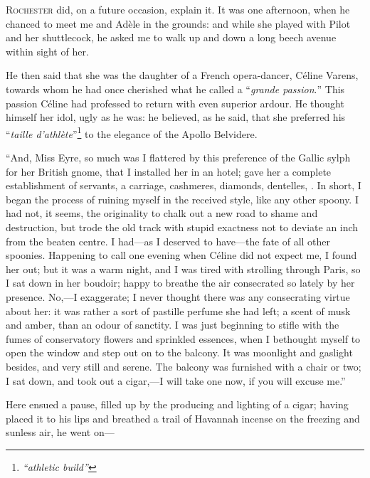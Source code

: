 
 \textsc{ Rochester} did, on a future occasion, explain it. It was one
afternoon, when he chanced to meet me and Adèle in the grounds: and
while she played with Pilot and her shuttlecock, he asked me to walk up
and down a long beech avenue within sight of her.

He then said that she was the daughter of a French opera-dancer, Céline
Varens, towards whom he had once cherished what he called a
\foreignquote{french}{\emph{grande passion}.} This passion Céline had professed to return
with even superior ardour. He thought himself her idol, ugly as he was:
he believed, as he said, that she preferred his \foreignquote{french}{\emph{taille
		d'athlète}}\footnote{\emph{\enquote{athletic build}}} to the elegance of the Apollo Belvidere.

\enquote{And, Miss Eyre, so much was I flattered by this preference of
	the Gallic sylph for her British gnome, that I installed her in an
	hotel; gave her a complete establishment of servants, a carriage,
	cashmeres, diamonds, dentelles, \etc. In short, I began the process of
	ruining myself in the received style, like any other spoony. I had not,
	it seems, the originality to chalk out a new road to shame and
	destruction, but trode the old track with stupid exactness not to
	deviate an inch from the beaten centre. I had---as I deserved to
	have---the fate of all other spoonies. Happening to call one evening
	when Céline did not expect me, I found her out; but it was a warm night,
	and I was tired with strolling through Paris, so I sat down in her
	boudoir; happy to breathe the air consecrated so lately by her
	presence. No,---I exaggerate; I never thought there was any
	consecrating virtue about her: it was rather a sort of pastille perfume
	she had left; a scent of musk and amber, than an odour of sanctity. I
	was just beginning to stifle with the fumes of conservatory flowers and
	sprinkled essences, when I bethought myself to open the window and step
	out on to the balcony. It was moonlight and gaslight besides, and very
	still and serene. The balcony was furnished with a chair or two; I sat
	down, and took out a cigar,---I will take one now, if you will excuse
	me.}

Here ensued a pause, filled up by the producing and lighting of a cigar;
having placed it to his lips and breathed a trail of Havannah incense on
the freezing and sunless air, he went on---

